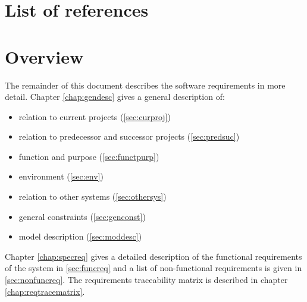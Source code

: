 \section{List of references}


\section{Overview}
The remainder of this document describes the software requirements in more detail. Chapter \ref{chap:gendesc} gives a general description of:
\begin{itemize}
\item relation to current projects (\ref{sec:curproj})
\item relation to predecessor and successor projects (\ref{sec:predsuc})
\item function and purpose (\ref{sec:functpurp})
\item environment (\ref{sec:env})
\item relation to other systems (\ref{sec:othersys})
\item general constraints (\ref{sec:genconst})
\item model description (\ref{sec:moddesc})
\end{itemize}
Chapter \ref{chap:specreq} gives a detailed description of the functional requirements of the system in \ref{sec:funcreq} and a list of non-functional requirements is given in \ref{sec:nonfuncreq}. The requirements traceability matrix is described in chapter \ref{chap:reqtracematrix}.
